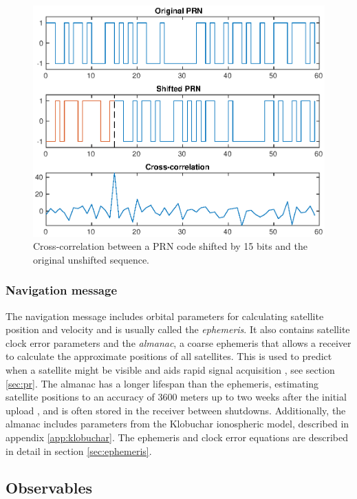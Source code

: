 \begin{figure}[!htbp]
    \centering
    \includegraphics[scale=0.7]{bilder/prn_autocorr.eps}
    \caption{Cross-correlation between a PRN code shifted by 15 bits and the original unshifted sequence.}
    \label{fig:prn-match}
\end{figure}

\subsubsection{Navigation message}
The navigation message includes orbital parameters for calculating satellite position and velocity and is usually called the \textit{ephemeris}. It also contains satellite clock error parameters and the \textit{almanac}, a coarse ephemeris that allows a receiver to calculate the approximate positions of all satellites. This is used to predict when a satellite might be visible and aids rapid signal acquisition \cite{misra2006global}, see section \ref{sec:pr}. The almanac has a longer lifespan than the ephemeris, estimating satellite positions to an accuracy of 3600 meters up to two weeks after the initial upload \cite{groves2013principles}, and is often stored in the receiver between shutdowns. Additionally, the almanac includes parameters from the Klobuchar ionospheric model, described in appendix \ref{app:klobuchar}. The ephemeris and clock error equations are described in detail in section \ref{sec:ephemeris}.
    
\subsection{Observables}
